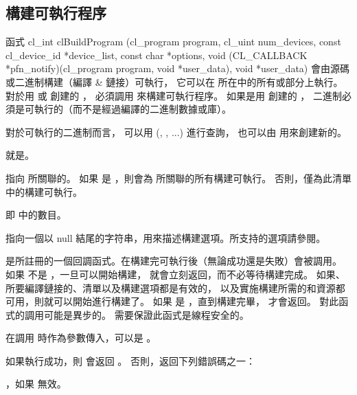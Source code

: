 \subsection{構建可執行程序}

函式
\startclc
cl_int clBuildProgram (cl_program program,
			cl_uint num_devices,
			const cl_device_id *device_list,
			const char *options,
			void (CL_CALLBACK *pfn_notify)(cl_program program,
						void *user_data),
			void *user_data)
\stopclc
會由源碼或二進制構建（編譯 & 鏈接）可執行，
它可以在  所在中的所有或部分上執行。
對於用  或  創建的 ，
必須調用  來構建可執行程序。
如果是用  創建的 ，
二進制必須是可執行的（而不是經過編譯的二進制數據或庫）。

對於可執行的二進制而言，
可以用 (, , ...) 進行查詢，
也可以由  用來創建新的。

 就是。

 指向  所關聯的。
如果  是 ，則會為  所關聯的所有構建可執行。
否則，僅為此清單中的構建可執行。

 即  中的數目。

 指向一個以 null 結尾的字符串，用來描述構建選項。所支持的選項請參閱。

 是所註冊的一個回調函式。在構建完可執行後（無論成功還是失敗）會被調用。
如果  不是 ，一旦可以開始構建，  就會立刻返回，而不必等待構建完成。
如果、所要編譯鏈接的、清單以及構建選項都是有效的，
以及實施構建所需的和資源都可用，則就可以開始進行構建了。
如果  是 ，直到構建完畢，  才會返回。
對此函式的調用可能是異步的。
需要保證此函式是線程安全的。

 在調用  時作為參數傳入，可以是 。

如果執行成功，則  會返回 。
否則，返回下列錯誤碼之一：
\startigBase
\item {}，如果  無效。

